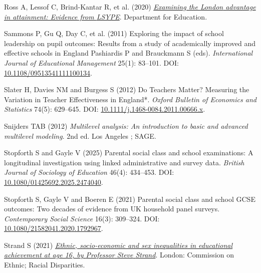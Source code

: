 \documentclass[
  11pt,
]{article}
\newlength{\cslhangindent}
\newenvironment{CSLReferences}[2] %
 {\begin{list}{}{%
  \setlength{\itemindent}{0pt}
  \setlength{\leftmargin}{0pt}
  \setlength{\parsep}{0pt}
  \ifodd #1
   \setlength{\leftmargin}{\cslhangindent}
   \setlength{\itemindent}{-1\cslhangindent}
  \fi
  \setlength{\itemsep}{#2\baselineskip}}}
 {\end{list}}
\begin{document}
\begin{CSLReferences}{1}{1}
Ross A, Lessof C, Brind-Kantar R, et al. (2020)
\emph{\href{https://www.gov.uk/government/publications/examining-the-london-advantage-in-attainment-evidence-from-lsype}{Examining
the {London} advantage in attainment: Evidence from {LSYPE}}}.
Department for Education.

Sammons P, Gu Q, Day C, et al. (2011) Exploring the impact of school
leadership on pupil outcomes: {Results} from a study of academically
improved and effective schools in {England} Pashiardis P and Brauckmann
S (eds). \emph{International Journal of Educational Management} 25(1):
83--101. DOI:
\href{https://doi.org/10.1108/09513541111100134}{10.1108/09513541111100134}.

Slater H, Davies NM and Burgess S (2012) Do {Teachers} {Matter}?
{Measuring} the {Variation} in {Teacher} {Effectiveness} in {England}*.
\emph{Oxford Bulletin of Economics and Statistics} 74(5): 629--645. DOI:
\href{https://doi.org/10.1111/j.1468-0084.2011.00666.x}{10.1111/j.1468-0084.2011.00666.x}.

Snijders TAB (2012) \emph{Multilevel analysis: An introduction to basic
and advanced multilevel modeling}. 2nd ed. Los Angeles ; SAGE.

Stopforth S and Gayle V (2025) Parental social class and school
examinations: A longitudinal investigation using linked administrative
and survey data. \emph{British Journal of Sociology of Education} 46(4):
434--453. DOI:
\href{https://doi.org/10.1080/01425692.2025.2474040}{10.1080/01425692.2025.2474040}.

Stopforth S, Gayle V and Boeren E (2021) Parental social class and
school {GCSE} outcomes: Two decades of evidence from {UK} household
panel surveys. \emph{Contemporary Social Science} 16(3): 309--324. DOI:
\href{https://doi.org/10.1080/21582041.2020.1792967}{10.1080/21582041.2020.1792967}.

Strand S (2021)
\emph{\href{https://www.gov.uk/government/publications/the-report-of-the-commission-on-race-and-ethnic-disparities-supporting-research/ethnic-socio-economic-and-sex-inequalities-in-educational-achievement-at-age-16-by-professor-steve-strand}{Ethnic,
socio-economic and sex inequalities in educational achievement at age
16, by {Professor} {Steve} {Strand}}}. London: Commission on Ethnic;
Racial Disparities.


\end{CSLReferences}
\end{document}
